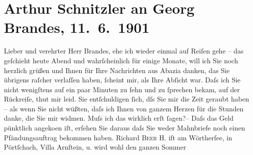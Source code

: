 

               \section[Arthur Schnitzler an Georg Brandes, 11. 6. 1901]{ Arthur Schnitzler an Georg Brandes, 11. 6. 1901}\nopagebreak{}\rehead{ }\begin{ledgroupsized}[t]{13cm}\normalsize\beginnumbering{} \toendnotes[C]{\smallbreak\pagebreak[2]} 
\toendnotes[C]{\smallbreak}\pstart{}{\pb}Lieber und verehrter Herr
                        Brandes,\pend\pstart
           ehe ich wieder einmal auf Reiſen gehe – das geſchieht heute Abend und
                    wahrſcheinlich für einige Monate, will ich Sie noch herzlich grüßen und Ihnen
                    für Ihre Nachrichten aus Abazia danken, das Sie
                    übrigens raſcher verlaſſen haben, ſcheint mir, als Ihre Abſicht war. Daſs ich
                    Sie {\pb}nicht wenigſtens auf ein paar
                    Minuten zu ſehn und zu ſprechen bekam, auf der Rückreiſe, thut mir leid. Sie
                    entſchuldigen ſich, dſs Sie mir die Zeit geraubt haben – als wenn Sie nicht
                    wüßten, daſs ich Ihnen von ganzem Herzen für die Stunden danke, die Sie mir
                    widmen. Muſs ich das wirklich erſt ſagen?– Daſs das Geld pünktlich angeko{\geminationm}en iſt, erſehen Sie daraus {\pb}daſs Sie weder Mahnbriefe noch einen
                    Pfändungsauftrag bekommen haben. Richard \textsc{Beer H.} iſt am Wörtherſee, in Pörtſchach, Villa Arnſtein, u. wird wohl den ganzen Sommer

\end{ledgroupsized}
